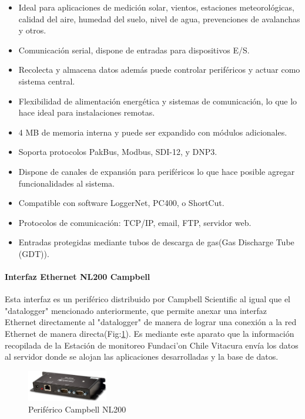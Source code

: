 \begin{itemize}
\item Ideal para aplicaciones de medición solar, vientos, estaciones meteorológicas, calidad del aire, humedad del suelo, nivel de agua, prevenciones de avalanchas y otros.
\item Comunicación serial, dispone de entradas para dispositivos E/S.
\item Recolecta y almacena datos además puede controlar periféricos y actuar como sistema central.
\item Flexibilidad de alimentación energética y sistemas de comunicación, lo que lo hace ideal para instalaciones remotas.
\item 4 MB de memoria interna y puede ser expandido con módulos adicionales.
\item Soporta protocolos PakBus, Modbus, SDI-12, y DNP3.
\item Dispone de canales de expansión para periféricos lo que hace posible agregar funcionalidades al sistema.
\item Compatible con software LoggerNet, PC400, o ShortCut.
\item Protocolos de comunicación: TCP/IP, email, FTP, servidor web.
\item Entradas protegidas mediante tubos de descarga de gas(Gas Discharge Tube (GDT)).
\end{itemize}

\paragraph{Interfaz Ethernet NL200 Campbell}
Esta interfaz es un periférico distribuido por Campbell Scientific al igual que el "datalogger" mencionado anteriormente, que permite anexar una interfaz Ethernet directamente al "datalogger" de manera de lograr una conexión a la red Ethernet de manera directa(Fig:\ref{nl200}). Es mediante este aparato que la información recopilada de la Estación de monitoreo Fundaci'on Chile Vitacura envía los datos al servidor donde se alojan las aplicaciones desarrolladas y la base de datos.\\

\begin{figure}[h!]
        \centering
        \includegraphics[width=100pt]{images/nl200}
        \caption{Periférico Campbell NL200}
	\label{nl200} 
\end{figure}

